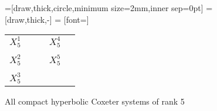 \begin{figure}
	\centering
	=[draw,thick,circle,minimum size=2mm,inner sep=0pt]
	 = [draw,thick,-]
	 = [font=\small]

	\begin{tabular}{MMcMM}
		$X_5^1$ & \comphyperfiveone & \hspace*{\cgpadh} & $X_5^4$ & \comphyperfivefour \\ \vspace*{\cgpadv} \\
		$X_5^2$ & \comphyperfivetwo & \hspace*{\cgpadh} & $X_5^5$ & \comphyperfivefive \\ \vspace*{\cgpadv} \\
		$X_5^3$ & \comphyperfivethree
	\end{tabular}
	\caption{All compact hyperbolic Coxeter systems of rank 5}
	\label{fig:compact-hyperbolic-coxeter-systems-5}
\end{figure}